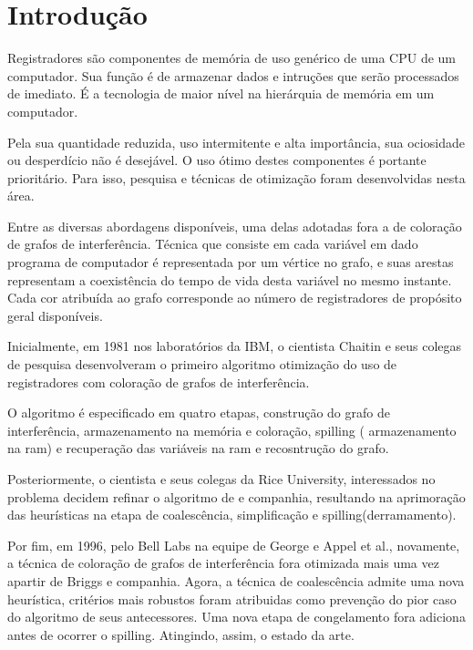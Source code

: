 \section{Introdução}

Registradores são componentes de memória de uso genérico de uma CPU de um computador.
Sua função é de armazenar dados e intruções que serão processados de imediato. É a tecnologia de maior nível na hierárquia de memória em um computador.

Pela sua quantidade reduzida, uso intermitente e alta importância, sua ociosidade ou desperdício não é desejável.
O uso ótimo destes componentes é portante prioritário. Para isso, pesquisa e técnicas de otimização foram desenvolvidas nesta área.

Entre as diversas abordagens disponíveis, uma delas adotadas fora a de coloração de grafos de interferência. Técnica que consiste
em cada variável em dado programa de computador é representada por um vértice no grafo, e suas arestas representam a coexistência
do tempo de vida desta variável no mesmo instante. Cada cor atribuída ao grafo corresponde ao número de registradores de propósito geral disponíveis.

Inicialmente, em 1981 nos laboratórios da IBM, o cientista Chaitin e seus colegas de pesquisa desenvolveram o primeiro algoritmo otimização
do uso de registradores com coloração de grafos de interferência.

O algoritmo é especificado em quatro etapas, construção do grafo de interferência, armazenamento na memória e coloração, spilling
( armazenamento na ram) e recuperação das variáveis na ram e recosntrução do grafo.

Posteriormente, o cientista \textcite{briggs} e seus colegas da Rice University, interessados no problema decidem refinar o
algoritmo de \textcite{chaitin} e companhia, resultando na aprimoração das heurísticas na etapa de coalescência, simplificação e spilling(derramamento).

Por fim, em 1996, pelo Bell Labs na equipe de George e Appel et al., novamente, a técnica de coloração de grafos de interferência
fora otimizada mais uma vez apartir de Briggs e companhia. Agora, a técnica de coalescência admite uma nova heurística, critérios
mais robustos foram atribuidas como prevenção do pior caso do algoritmo de seus antecessores. Uma nova etapa de congelamento
fora adiciona antes de ocorrer o spilling. Atingindo, assim, o estado da arte.
